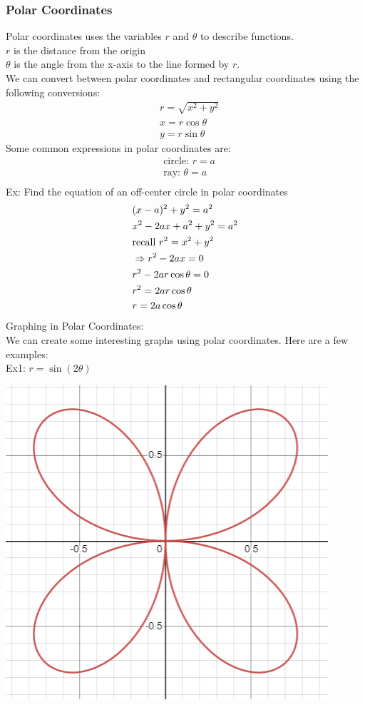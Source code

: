 \documentclass[11pt, fleqn]{article}
\begin{document}
\subsubsection{Polar Coordinates}
Polar coordinates uses the variables $r$ and $\theta$ to describe functions.\\
$r$ is the distance from the origin\\
$\theta$ is the angle from the x-axis to the line formed by $r$.\\
We can convert between polar coordinates and rectangular coordinates using the following conversions:
\begin{align*}
    &r=\sqrt{x^2+y^2}\\
    &x=r\cos\theta\\
    &y=r\sin\theta
\end{align*}
Some common expressions in polar coordinates are:
\begin{align*}
    &\text{circle: }r=a\\
    &\text{ray: }\theta=a\\
\end{align*}
Ex: Find the equation of an off-center circle in polar coordinates
\begin{align*}
    &(x-a)^2+y^2=a^2\\
    &x^2-2ax+a^2+y^2=a^2\\
    &\text{recall }r^2=x^2+y^2\\
    &\Rightarrow r^2-2ax=0\\
    &r^2-2ar\cos\theta=0\\
    &r^2=2ar\cos\theta\\
    &r=2a\cos\theta
\end{align*}
Graphing in Polar Coordinates:\\
We can create some interesting graphs using polar coordinates. Here are a few examples:\\
Ex1: $r=\sin(2\theta)$\\
\centerline{\includegraphics[scale=0.7]{PreCalcPictures/PolarGraph1.png}}
\end{document}
